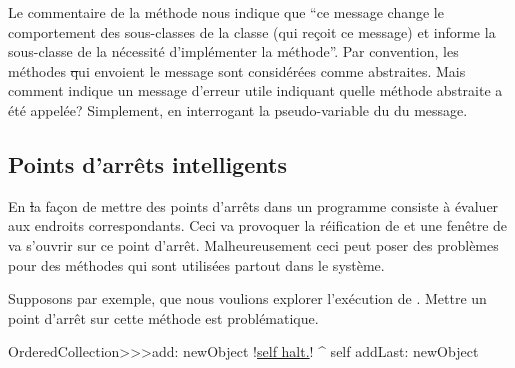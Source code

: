 \documentclass[a4paper,10pt,twoside]{book}
\begin{document}
Le commentaire de la méthode nous indique que ``ce message change le comportement des sous-classes de la classe (qui reçoit ce message) et informe la sous-classe de la nécessité d'implémenter la méthode''.%
Par convention, les méthodes \st qui envoient le message  sont considérées comme abstraites. Mais
comment \mbox{} indique un message d'erreur utile indiquant quelle méthode abstraite a été appelée? Simplement, en interrogant la pseudo-variable  du \sender du message.

\subsection{Points d'arrêts intelligents}

En \st la façon de mettre des points d'arrêts dans un programme consiste à évaluer  aux endroits correspondants. Ceci va provoquer la réification de  et une fenêtre de  va s'ouvrir sur ce point d'arrêt.
Malheureusement ceci peut poser des problèmes pour des méthodes qui sont utilisées partout dans le système.

Supposons par exemple, que nous voulions explorer l'exécution de .
Mettre un point d'arrêt sur cette méthode est problématique.


\begin{code}{}
OrderedCollection>>>add: newObject
	!\underline{self halt.}!
	^ self addLast: newObject
\end{code}
\end{document}

